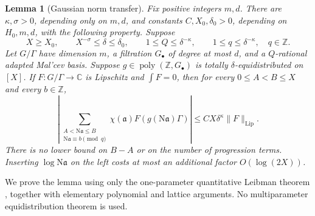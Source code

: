 \documentclass[11pt]{article}
\newtheorem{lemma}[theorem]{Lemma}
\theoremstyle{definition}
\theoremstyle{remark}
\begin{document}
\begin{lemma}[Gaussian norm transfer]\label{lem:gn-norm-transfer}
Fix positive integers $m,d$. There are $\kappa,\sigma>0$, depending only
on $m,d$, and constants $C,X_0,\delta_0>0$, depending on $H_0,m,d$, with
the following property. Suppose
\[
 X\geq X_0,\qquad X^{-\sigma}\leq\delta\leq\delta_0,
 \qquad 1\leq Q\leq\delta^{-\kappa},\qquad
 1\leq q\leq\delta^{-\kappa},\quad q\in\mathbb Z.
\]
Let $G/\Gamma$ have dimension $m$, a filtration $G_\bullet$ of degree at
most $d$, and a $Q$-rational adapted Mal'cev basis. Suppose
$g\in\operatorname{poly}(\mathbb Z,G_\bullet)$ is totally
$\delta$-equidistributed on $[X]$. If $F:G/\Gamma\to\mathbb C$ is
Lipschitz and $\int F=0$, then for every $0\leq A<B\leq X$ and every
$b\in\mathbb Z$,
\begin{equation}\label{eq:gn-transfer}
 \left|\sum_{\substack{A<\mathrm N\mathfrak a\leq B\\
                 \mathrm N\mathfrak a\equiv b\pmod q}}
       \chi(\mathfrak a)F(g(\mathrm N\mathfrak a)\Gamma)\right|
 \leq C X\delta^\kappa\|F\|_{\mathrm{Lip}}.
\end{equation}
There is no lower bound on $B-A$ or on the number of progression terms.
Inserting $\log\mathrm N\mathfrak a$ on the left costs at most an
additional factor $O(\log(2X))$.
\end{lemma}

We prove the lemma using only the one-parameter quantitative Leibman
theorem \cite[Theorem 2.9]{GTOrbits2012}, together with elementary
polynomial and lattice arguments. No multiparameter equidistribution
theorem is used.
\end{document}
